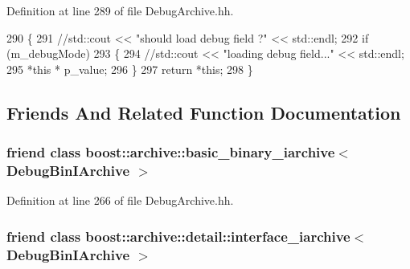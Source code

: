 Definition at line 289 of file Debug\-Archive.\-hh.


\begin{DoxyCode}
290   \{
291     \textcolor{comment}{//std::cout << "should load debug field ?" << std::endl;}
292     \textcolor{keywordflow}{if} (m\_debugMode)
293     \{
294       \textcolor{comment}{//std::cout << "loading debug field..." << std::endl;}
295       *\textcolor{keyword}{this} * p\_value;
296     \}
297     \textcolor{keywordflow}{return} *\textcolor{keyword}{this};
298   \}
\end{DoxyCode}


\subsection{Friends And Related Function Documentation}
\hypertarget{classxtd_1_1serializer_1_1DebugBinIArchive_abc4efd1d58236e3dbfef39240b5457d4}{
\subsubsection[{boost\-::archive\-::basic\-\_\-binary\-\_\-iarchive$<$ Debug\-Bin\-I\-Archive $>$}]{\setlength{\rightskip}{0pt plus 5cm}friend class boost\-::archive\-::basic\-\_\-binary\-\_\-iarchive$<$ {\bf Debug\-Bin\-I\-Archive} $>$\hspace{0.3cm}{\ttfamily [friend]}}}\label{classxtd_1_1serializer_1_1DebugBinIArchive_abc4efd1d58236e3dbfef39240b5457d4}


Definition at line 266 of file Debug\-Archive.\-hh.

\hypertarget{classxtd_1_1serializer_1_1DebugBinIArchive_aace6c76e9b138089c32705b6ec13b0e5}{
\subsubsection[{boost\-::archive\-::detail\-::interface\-\_\-iarchive$<$ Debug\-Bin\-I\-Archive $>$}]{\setlength{\rightskip}{0pt plus 5cm}friend class boost\-::archive\-::detail\-::interface\-\_\-iarchive$<$ {\bf Debug\-Bin\-I\-Archive} $>$\hspace{0.3cm}{\ttfamily [friend]}}}\label{classxtd_1_1serializer_1_1DebugBinIArchive_aace6c76e9b138089c32705b6ec13b0e5}



